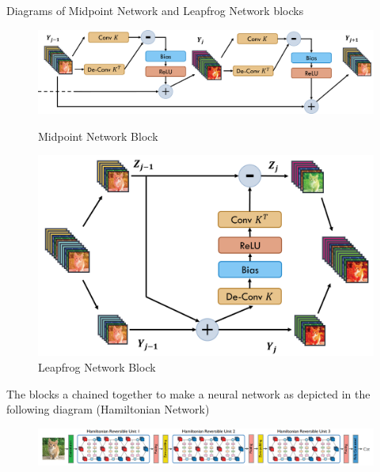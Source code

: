 \documentclass{article}
\theoremstyle{remark}
\begin{document}
Diagrams of Midpoint Network and Leapfrog Network blocks
\begin{figure}[H]
    \centering
    \begin{minipage}{0.45\textwidth}
        \centering
        \includegraphics[width=\textwidth]{imgs/midpoint_block.png} %
        \caption{Midpoint Network Block}
    \end{minipage}\hfill
    \begin{minipage}{0.45\textwidth}
        \centering
        \includegraphics[width=\textwidth]{imgs/leap_frog_block.png} %
        \caption{Leapfrog Network Block}
    \end{minipage}
\end{figure}
The blocks a chained together to make a neural network as depicted in the following diagram (Hamiltonian Network)

\begin{figure}[H]
    \centering
    \includegraphics[width=\textwidth]{imgs/hamiltonian_network.png}    
\end{figure}
\end{document}

